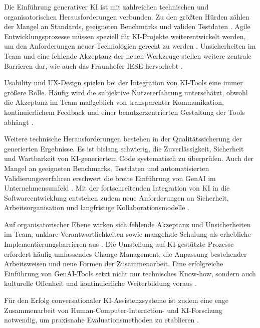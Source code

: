 
Die Einführung generativer KI ist mit zahlreichen technischen und
organisatorischen Herausforderungen verbunden. Zu den größten Hürden zählen der
Mangel an Standards, geeigneten Benchmarks und validen Testdaten
\cite{nguyen-duc_generative_2023}. Agile Entwicklungsprozesse müssen speziell
für KI-Projekte weiterentwickelt werden, um den Anforderungen neuer
Technologien gerecht zu werden \cite{gill_agile_2025}. Unsicherheiten im Team
und eine fehlende Akzeptanz der neuen Werkzeuge stellen weitere zentrale
Barrieren dar, wie auch das Fraunhofer IESE hervorhebt
\cite{siebert_generative_2024}.

Usability und UX-Design spielen bei der Integration von KI-Tools eine immer
größere Rolle. Häufig wird die subjektive Nutzererfahrung unterschätzt, obwohl
die Akzeptanz im Team maßgeblich von transparenter Kommunikation,
kontinuierlichem Feedback und einer benutzerzentrierten Gestaltung der Tools
abhängt \cite{sergeyuk_human-ai_2025, sifi_how_2025}.

Weitere technische Herausforderungen bestehen in der Qualitätssicherung der
generierten Ergebnisse. Es ist bislang schwierig, die Zuverlässigkeit,
Sicherheit und Wartbarkeit von KI-generiertem Code systematisch zu überprüfen.
Auch der Mangel an geeigneten Benchmarks, Testdaten und automatisierten
Validierungsverfahren erschwert die breite Einführung von GenAI im
Unternehmensumfeld \cite{nguyen-duc_generative_2023}. Mit der fortschreitenden
Integration von KI in die Softwareentwicklung entstehen zudem neue
Anforderungen an Sicherheit, Arbeitsorganisation und langfristige
Kollaborationsmodelle \cite{hazra_ai_2025}.

Auf organisatorischer Ebene wirken sich fehlende Akzeptanz und Unsicherheiten
im Team, unklare Verantwortlichkeiten sowie mangelnde Schulung als erhebliche
Implementierungsbarrieren aus \cite{nguyen-duc_generative_2023,
    schmitt_generative_2024}. Die Umstellung auf KI-gestützte Prozesse erfordert
häufig umfassendes Change Management, die Anpassung bestehender Arbeitsweisen
und neue Formen der Zusammenarbeit. Eine erfolgreiche Einführung von
GenAI-Tools setzt nicht nur technisches Know-how, sondern auch kulturelle
Offenheit und kontinuierliche Weiterbildung voraus
\cite{schmitt_generative_2024}.

Für den Erfolg conversationaler KI-Assistenzsysteme ist zudem eine enge
Zusammenarbeit von Human-Computer-Interaction- und KI-Forschung notwendig, um
praxisnahe Evaluationsmethoden zu etablieren \cite{richards_bridging_2025}.
